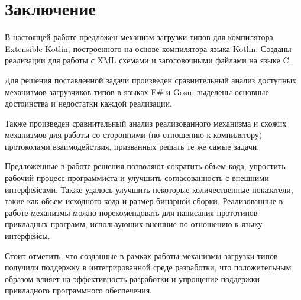 \clearpage
\section{Заключение}
В настоящей работе предложен механизм загрузки типов для компилятора Extensible Kotlin, построенного на основе компилятора языка Kotlin.
Созданы реализации для работы с XML схемами и заголовочными файлами на языке C.

Для решения поставленной задачи произведен сравнительный анализ доступных механизмов загрузчиков типов в языках
F\# и Gosu, выделены основные достоинства и недостатки каждой реализации.

Также произведен сравнительный анализ реализованного механизма и схожих механизмов для работы со сторонними
(по отношению к компилятору) протоколами взаимодействия, призванных решать те же самые задачи.

Предложенные в работе решения позволяют сократить объем кода, упростить рабочий процесс программиста и улучшить согласованность с внешними интерфейсами.
Также удалось улучшить некоторые количественные показатели, такие как объем исходного кода и размер бинарной сборки.
Реализованные в работе механизмы можно порекомендовать для написания прототипов прикладных программ, использующих внешние по отношению к языку интерфейсы.

Стоит отметить, что созданные в рамках работы механизмы загрузки типов получили поддержку в интегрированной среде разработки, что положительным образом влияет на эффективность разработки и упрощение поддержки прикладного программного обеспечения.

\clearpage